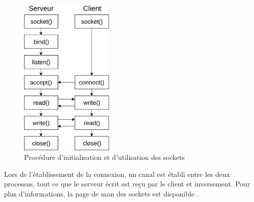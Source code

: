 \begin{figure}
    \begin{center}
        \includegraphics[width=0.4\textwidth]{images/sockets.png}
    \end{center}
    \caption{Procédure d'initialisation et d'utilisation des sockets}
    \label{sockets_procedure}
\end{figure}
Lors de l'établissement de la connexion, un canal est établi entre les deux processus, tout ce que 
le serveur écrit est reçu par le client et inversement. Pour plus d'informations, la page de man 
des sockets est disponible \cite{ref39}.
